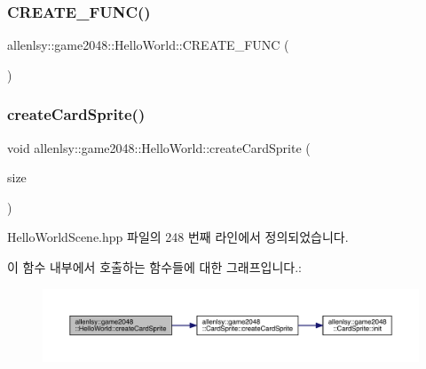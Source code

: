 \subsubsection{\texorpdfstring{C\+R\+E\+A\+T\+E\+\_\+\+F\+U\+N\+C()}{CREATE\_FUNC()}}
{\footnotesize\ttfamily allenlsy\+::game2048\+::\+Hello\+World\+::\+C\+R\+E\+A\+T\+E\+\_\+\+F\+U\+NC (\begin{DoxyParamCaption}\item[{\hyperlink{classallenlsy_1_1game2048_1_1_hello_world}{Hello\+World}}]{ }\end{DoxyParamCaption})}

\mbox{\label{classallenlsy_1_1game2048_1_1_hello_world_ad55dd12c9e76eba2e7c79dafbd103e54}} 
\subsubsection{\texorpdfstring{create\+Card\+Sprite()}{createCardSprite()}}
{\footnotesize\ttfamily void allenlsy\+::game2048\+::\+Hello\+World\+::create\+Card\+Sprite (\begin{DoxyParamCaption}\item[{cocos2d\+::\+Size}]{size }\end{DoxyParamCaption})\hspace{0.3cm}{\ttfamily [inline]}}



Hello\+World\+Scene.\+hpp 파일의 248 번째 라인에서 정의되었습니다.

이 함수 내부에서 호출하는 함수들에 대한 그래프입니다.\+:
\nopagebreak
\begin{figure}[H]
\begin{center}
\leavevmode
\includegraphics[width=350pt]{classallenlsy_1_1game2048_1_1_hello_world_ad55dd12c9e76eba2e7c79dafbd103e54_cgraph}
\end{center}
\end{figure}
\mbox{\label{classallenlsy_1_1game2048_1_1_hello_world_a86ca8a563151e5e5d308f98ff6c36f95}} 
